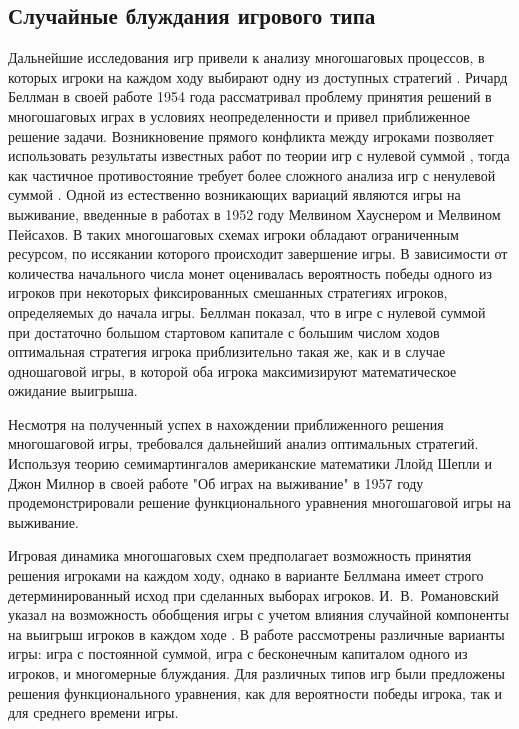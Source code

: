 \subsection{Случайные блуждания игрового типа}\label{subsec:ch1/sec3/sub2}

Дальнейшие исследования игр привели к анализу многошаговых процессов, в которых игроки на каждом ходу выбирают одну из доступных стратегий \cite{bellman_decision_1954}. 
Ричард Беллман в своей работе 1954 года рассматривал проблему принятия решений в многошаговых играх в условиях неопределенности \cite{bellman_decision-making_1954} и 
привел приближенное решение задачи. Возникновение прямого конфликта между игроками позволяет использовать результаты известных работ по теории игр с нулевой суммой \cite{nash_non-cooperative_1951}, 
тогда как частичное противостояние требует более сложного анализа игр с ненулевой суммой \cite{bellman_non-zero_1949}. Одной из естественно возникающих вариаций 
являются игры на выживание, введенные в работах \cite{hausner_games_1952, peisakoff_more_1952} в 1952 году Мелвином Хауснером и Мелвином Пейсахов. 
В таких многошаговых схемах игроки обладают ограниченным ресурсом, 
по иссякании которого происходит завершение игры. В зависимости от количества начального числа монет оценивалась вероятность 
победы одного из игроков при некоторых фиксированных смешанных стратегиях игроков, определяемых до начала игры. Беллман показал, что в игре с нулевой суммой 
при достаточно большом стартовом капитале с большим числом ходов оптимальная стратегия игрока приблизительно такая же, как и в случае
одношаговой игры, в которой оба игрока максимизируют математическое ожидание выигрыша. 

Несмотря на полученный успех в нахождении приближенного решения многошаговой игры, требовался дальнейший анализ оптимальных стратегий. 
Используя теорию семимартингалов американские математики Ллойд Шепли и Джон Милнор в своей работе "Об играх на выживание" в 1957 году \cite{milnor_games_1956}
продемонстрировали решение функционального уравнения многошаговой игры на выживание. 

Игровая динамика многошаговых схем предполагает возможность принятия решения игроками на каждом ходу, однако в варианте Беллмана
имеет строго детерминированный исход при сделанных выборах игроков. И.~В.~Романовский указал на возможность обобщения игры с учетом влияния
случайной компоненты на выигрыш игроков в каждом ходе \cite{romanovsky_1961}. В работе рассмотрены различные варианты игры: игра с постоянной суммой, 
игра с бесконечным капиталом одного из игроков, и многомерные блуждания. Для различных типов игр были предложены решения функционального уравнения, 
как для вероятности победы игрока, так и для среднего времени игры.

